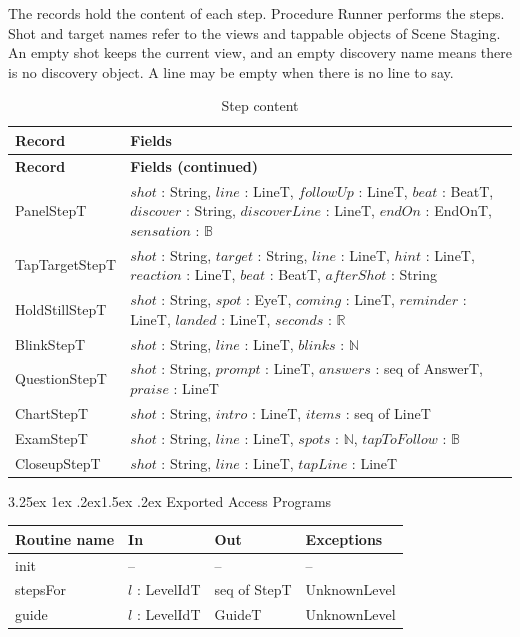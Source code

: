 \documentclass[10pt, titlepage]{article}
\makeatletter
\renewcommand\paragraph{\@startsection{paragraph}{4}{\z@}%
  {3.25ex \@plus 1ex \@minus .2ex}{1.5ex \@plus .2ex}%
  {\normalfont\normalsize\bfseries}}
\newcommand{\B}{\mathbb{B}}
\newcommand{\N}{\mathbb{N}}
\newcommand{\R}{\mathbb{R}}
\newcommand{\T}[1]{\mathit{#1}}          %
\newenvironment{accessprogs}{%
  \begin{center}\small
  \begin{tabular}{>{\raggedright\arraybackslash}p{3.0cm}
    >{\raggedright\arraybackslash}p{5.0cm}
    >{\raggedright\arraybackslash}p{2.8cm}
    >{\raggedright\arraybackslash}p{3.4cm}}
  \toprule
  \textbf{Routine name} & \textbf{In} & \textbf{Out} & \textbf{Exceptions}\\
  \midrule}{%
  \bottomrule
  \end{tabular}
  \end{center}}
\makeatother
\begin{document}
The records hold the content of each step. Procedure Runner performs the
steps. Shot and target names refer to the views and tappable objects of
Scene Staging. An empty shot keeps the current view, and an empty
discovery name means there is no discovery object. A line may be empty
when there is no line to say.

\begingroup
\small
\renewcommand{\arraystretch}{1.2}
\begin{longtable}{@{}p{}p{}@{}}
\caption{Step content}\label{TblStepContent}\\
\toprule
\textbf{Record} & \textbf{Fields}\\
\midrule
\endfirsthead
\toprule
\textbf{Record} & \textbf{Fields (continued)}\\
\midrule
\endhead
\bottomrule
\endfoot
PanelStepT & $\T{shot}$ : String, $\T{line}$ : LineT,
$\T{followUp}$ : LineT, $\T{beat}$ : BeatT,
$\T{discover}$ : String, $\T{discoverLine}$ : LineT,
$\T{endOn}$ : EndOnT, $\T{sensation}$ : $\B$\\[0.4em]
TapTargetStepT & $\T{shot}$ : String, $\T{target}$ : String,
$\T{line}$ : LineT, $\T{hint}$ : LineT, $\T{reaction}$ : LineT,
$\T{beat}$ : BeatT, $\T{afterShot}$ : String\\[0.4em]
HoldStillStepT & $\T{shot}$ : String, $\T{spot}$ : EyeT,
$\T{coming}$ : LineT, $\T{reminder}$ : LineT,
$\T{landed}$ : LineT, $\T{seconds}$ : $\R$\\[0.4em]
BlinkStepT & $\T{shot}$ : String, $\T{line}$ : LineT,
$\T{blinks}$ : $\N$\\[0.4em]
QuestionStepT & $\T{shot}$ : String, $\T{prompt}$ : LineT,
$\T{answers}$ : seq of AnswerT, $\T{praise}$ : LineT\\[0.4em]
ChartStepT & $\T{shot}$ : String, $\T{intro}$ : LineT,
$\T{items}$ : seq of LineT\\[0.4em]
ExamStepT & $\T{shot}$ : String, $\T{line}$ : LineT,
$\T{spots}$ : $\N$, $\T{tapToFollow}$ : $\B$\\[0.4em]
CloseupStepT & $\T{shot}$ : String, $\T{line}$ : LineT,
$\T{tapLine}$ : LineT\\
\end{longtable}
\endgroup

\paragraph{Exported Access Programs}

\begin{accessprogs}
init & -- & -- & --\\
stepsFor & $l$ : LevelIdT & seq of StepT & UnknownLevel\\
guide & $l$ : LevelIdT & GuideT & UnknownLevel\\
\end{accessprogs}
\end{document}
